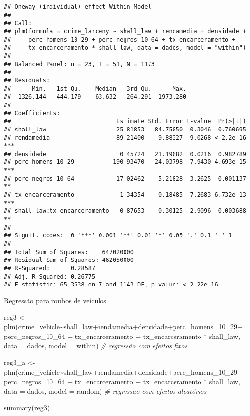 \documentclass[
]{article}
\newenvironment{Shaded}{\begin{snugshade}}{\end{snugshade}}
\newcommand{\AttributeTok}[1]{\textcolor[rgb]{0.77,0.63,0.00}{#1}}
\newcommand{\CommentTok}[1]{\textcolor[rgb]{0.56,0.35,0.01}{\textit{#1}}}
\newcommand{\FunctionTok}[1]{\textcolor[rgb]{0.00,0.00,0.00}{#1}}
\newcommand{\NormalTok}[1]{#1}
\newcommand{\OtherTok}[1]{\textcolor[rgb]{0.56,0.35,0.01}{#1}}
\newcommand{\SpecialCharTok}[1]{\textcolor[rgb]{0.00,0.00,0.00}{#1}}
\newcommand{\StringTok}[1]{\textcolor[rgb]{0.31,0.60,0.02}{#1}}
\begin{document}
\begin{verbatim}
## Oneway (individual) effect Within Model
## 
## Call:
## plm(formula = crime_larceny ~ shall_law + rendamedia + densidade + 
##     perc_homens_10_29 + perc_negros_10_64 + tx_encarceramento + 
##     tx_encarceramento * shall_law, data = dados, model = "within")
## 
## Balanced Panel: n = 23, T = 51, N = 1173
## 
## Residuals:
##      Min.   1st Qu.    Median   3rd Qu.      Max. 
## -1326.144  -444.179   -63.632   264.291  1973.280 
## 
## Coefficients:
##                              Estimate Std. Error t-value  Pr(>|t|)    
## shall_law                   -25.81853   84.75050 -0.3046  0.760695    
## rendamedia                   89.21400    9.88327  9.0268 < 2.2e-16 ***
## densidade                     0.45724   21.19082  0.0216  0.982789    
## perc_homens_10_29           190.93470   24.03798  7.9430 4.693e-15 ***
## perc_negros_10_64            17.02462    5.21828  3.2625  0.001137 ** 
## tx_encarceramento             1.34354    0.18485  7.2683 6.732e-13 ***
## shall_law:tx_encarceramento   0.87653    0.30125  2.9096  0.003688 ** 
## ---
## Signif. codes:  0 '***' 0.001 '**' 0.01 '*' 0.05 '.' 0.1 ' ' 1
## 
## Total Sum of Squares:    647020000
## Residual Sum of Squares: 462050000
## R-Squared:      0.28587
## Adj. R-Squared: 0.26775
## F-statistic: 65.3638 on 7 and 1143 DF, p-value: < 2.22e-16
\end{verbatim}

Regressão para roubos de veículos

\begin{Shaded}
\begin{Highlighting}[]
\NormalTok{reg3 }\OtherTok{\textless{}{-}} \FunctionTok{plm}\NormalTok{(crime\_vehicle}\SpecialCharTok{\textasciitilde{}}\NormalTok{shall\_law}\SpecialCharTok{+}\NormalTok{rendamedia}\SpecialCharTok{+}\NormalTok{densidade}\SpecialCharTok{+}\NormalTok{perc\_homens\_10\_29}\SpecialCharTok{+}
\NormalTok{              perc\_negros\_10\_64 }\SpecialCharTok{+}\NormalTok{ tx\_encarceramento }\SpecialCharTok{+}\NormalTok{ tx\_encarceramento }\SpecialCharTok{*}\NormalTok{ shall\_law, }
            \AttributeTok{data =}\NormalTok{ dados, }\AttributeTok{model =} \StringTok{\textquotesingle{}within\textquotesingle{}}\NormalTok{) }\CommentTok{\# regressão com efeitos fixos}

\NormalTok{reg3\_a }\OtherTok{\textless{}{-}} \FunctionTok{plm}\NormalTok{(crime\_vehicle}\SpecialCharTok{\textasciitilde{}}\NormalTok{shall\_law}\SpecialCharTok{+}\NormalTok{rendamedia}\SpecialCharTok{+}\NormalTok{densidade}\SpecialCharTok{+}\NormalTok{perc\_homens\_10\_29}\SpecialCharTok{+}
\NormalTok{              perc\_negros\_10\_64 }\SpecialCharTok{+}\NormalTok{ tx\_encarceramento }\SpecialCharTok{+}\NormalTok{ tx\_encarceramento }\SpecialCharTok{*}\NormalTok{ shall\_law, }
            \AttributeTok{data =}\NormalTok{ dados, }\AttributeTok{model =} \StringTok{\textquotesingle{}random\textquotesingle{}}\NormalTok{) }\CommentTok{\# regressão com efeitos aleatórios}

\FunctionTok{summary}\NormalTok{(reg3)}
\end{Highlighting}
\end{Shaded}
\end{document}
